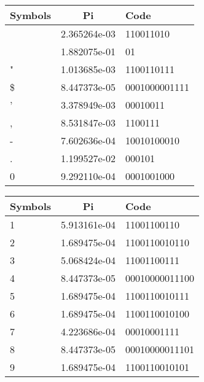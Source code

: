 \documentclass[12pt]{article} %
\numberwithin{equation}{section}
\begin{document}
\setlength{\arrayrulewidth}{0.7mm}
\begin{table}[hptb]
\begin{minipage}{.5\linewidth}
\centering
\begin{tabular}{lcl}  %
\hline
Symbols  &Pi 				 &Code\\   \hline
 		 &2.365264e-03 		 &110011010\\
  		 &1.882075e-01 		 &01\\
" 		 &1.013685e-03 		 &1100110111\\
\$ 		 &8.447373e-05 		 &0001000001111\\
' 		 &3.378949e-03 		 &00010011\\
, 		 &8.531847e-03 		 &1100111\\
- 		 &7.602636e-04 		 &10010100010\\
. 		 &1.199527e-02 		 &000101\\
0 		 &9.292110e-04 		 &0001001000\\  \hline
\end{tabular}
\end{minipage}\begin{minipage}{.5\linewidth}
\centering
\begin{tabular}{lcl}  %
\hline
Symbols  &Pi 				 &Code\\   \hline
1 		 &5.913161e-04 		 &11001100110\\
2 		 &1.689475e-04 		 &1100110010110\\
3 		 &5.068424e-04 		 &11001100111\\
4 		 &8.447373e-05 		 &00010000011100\\
5 		 &1.689475e-04 		 &1100110010111\\
6 		 &1.689475e-04 		 &1100110010100\\
7 		 &4.223686e-04 		 &00010001111\\
8 		 &8.447373e-05 		 &00010000011101\\
9 		 &1.689475e-04 		 &1100110010101\\  \hline
\end{tabular}
\end{minipage}
\end{table}
\end{document}
